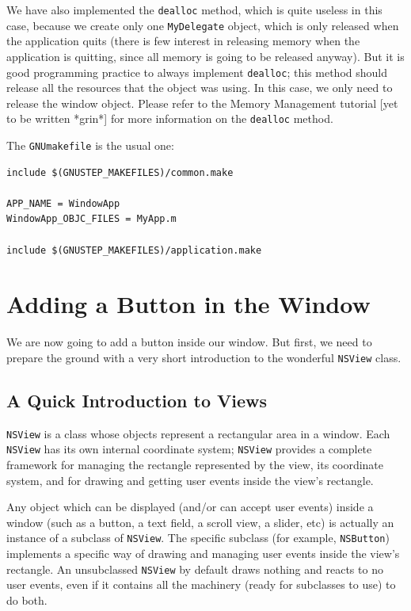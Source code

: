 \documentclass[a4paper]{article}
\begin{document}
We have also implemented the \texttt{dealloc} method, which is quite
useless in this case, because we create only one \texttt{MyDelegate}
object, which is only released when the application quits (there is
few interest in releasing memory when the application is quitting,
since all memory is going to be released anyway).  But it is good
programming practice to always implement \texttt{dealloc}; this method
should release all the resources that the object was using.  In this
case, we only need to release the window object.  Please refer to the
Memory Management tutorial [yet to be written *grin*] for more
information on the \texttt{dealloc} method.

The \texttt{GNUmakefile} is the usual one:
\begin{verbatim}
include $(GNUSTEP_MAKEFILES)/common.make

APP_NAME = WindowApp
WindowApp_OBJC_FILES = MyApp.m 

include $(GNUSTEP_MAKEFILES)/application.make
\end{verbatim}

\section{Adding a Button in the Window}
We are now going to add a button inside our window.  But first, we
need to prepare the ground with a very short introduction to the
wonderful \texttt{NSView} class.

\subsection{A Quick Introduction to Views}
\texttt{NSView} is a class whose objects represent a rectangular area
in a window.  Each \texttt{NSView} has its own internal coordinate
system; \texttt{NSView} provides a complete framework for managing the
rectangle represented by the view, its coordinate system, and for
drawing and getting user events inside the view's rectangle.

Any object which can be displayed (and/or can accept user events)
inside a window (such as a button, a text field, a scroll view, a
slider, etc) is actually an instance of a subclass of \texttt{NSView}.
The specific subclass (for example, \texttt{NSButton}) implements a
specific way of drawing and managing user events inside the view's
rectangle.  An unsubclassed \texttt{NSView} by default draws nothing
and reacts to no user events, even if it contains all the machinery
(ready for subclasses to use) to do both.
\end{document}
